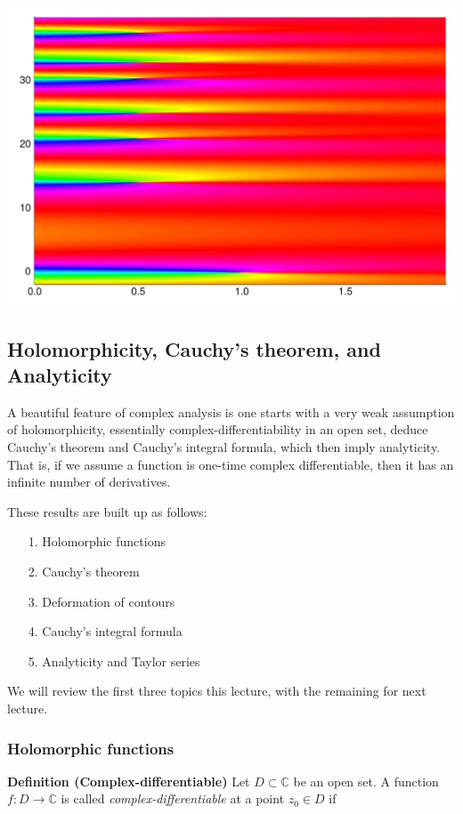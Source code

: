 \documentclass[12pt,a4paper]{article}
\begin{document}
\includegraphics[width=\linewidth]{figures/Lecture1_17_1.pdf}

\subsection{Holomorphicity, Cauchy's theorem, and Analyticity}
A beautiful feature of complex analysis is one starts with a very weak assumption of holomorphicity, essentially complex-differentiability in an open set, deduce Cauchy's theorem and Cauchy's integral formula, which then imply analyticity. That is, if we assume a function is one-time complex differentiable, then it has an infinite number of derivatives.

These results are built up as follows:

\begin{itemize}
\item[1. ] Holomorphic functions


\item[2. ] Cauchy's theorem 


\item[3. ] Deformation of contours


\item[4. ] Cauchy's integral formula


\item[5. ] Analyticity and Taylor series

\end{itemize}
We will review the first three topics this lecture, with the remaining for next lecture.

\subsubsection{Holomorphic functions}
\textbf{Definition (Complex-differentiable)} Let $D \subset {\mathbb C}$ be an open set.  A function $f : D \rightarrow {\mathbb C}$ is called \emph{complex-differentiable} at a point $z_0 \in D$ if 
\end{document}
